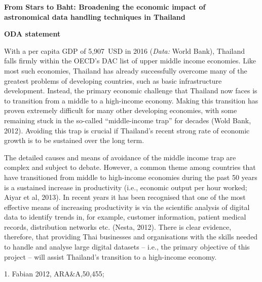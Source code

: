 \documentclass[11pt]{article}
\begin{document}
\setcounter{figure}{0}
\noindent
{\LARGE \bf From Stars to Baht: Broadening the economic impact of \\
astronomical data handling techniques in Thailand}

\vspace{5mm}

\noindent
{\Large \bf ODA statement}

\vspace{2mm}

\noindent
With a per capita GDP of 5,907~USD in 2016 ({\it Data:} World Bank), Thailand falls firmly within the OECD's DAC list of upper middle income economies. Like most such economies, Thailand has already successfully overcome many of the greatest problems of developing countries, such as basic infrastructure development. Instead, the primary economic challenge that Thailand now faces is to transition from a middle to a high-income economy. Making this transition has proven extremely difficult for many other developing economies, with some remaining stuck in the so-called ``middle-income trap'' for decades (Wold Bank, 2012). Avoiding this trap is crucial if Thailand's recent strong rate of economic growth is to be sustained over the long term.     

\vspace{2mm}
The detailed causes and means of avoidance of the middle income trap are complex and subject to debate. However, a common theme among countries that have transitioned from middle to high-income economies during the past 50 years is a sustained increase in productivity (i.e., economic output per hour worked; Aiyar et al, 2013). In recent years it has been recognised that one of the most effective means of increasing productivity is via the scientific analysis of digital data to identify trends in, for example, customer information, patient medical records, distribution networks etc. (Nesta, 2012). There is clear evidence, therefore, that providing Thai businesses and organisations with the skills needed to handle and analyse large digital datasets -- i.e., the primary objective of this project -- will assist Thailand's transition to a high-income economy.

\vspace{10mm}
 {\scriptsize 1. Fabian 2012,
  ARA\&A,50,455;
}
\end{document}
